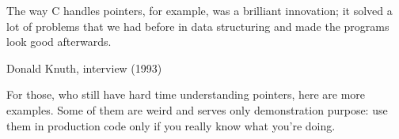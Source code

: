 \myindex{\CLanguageElements!\Pointers}
\label{label_pointers}

\epigraph{The way C handles pointers, for example, was a brilliant innovation;
it solved a lot of problems that we had before in data structuring and
made the programs look good afterwards.}{Donald Knuth, interview (1993)}

For those, who still have hard time understanding \CCpp pointers, here are more examples.
Some of them are weird and serves only demonstration purpose:
use them in production code only if you really know what you're doing.










